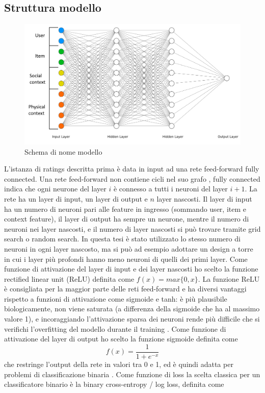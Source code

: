 \documentclass[12pt,italian]{report}
\begin{document}
\subsection{Struttura modello}

\begin{figure}
  \includegraphics[width=\linewidth]{immagini/ffnet_schema.png}
  \caption{Schema di nome modello}
  \label{fig:curse-dim}
\end{figure}

L'istanza di ratings descritta prima è data in input ad una rete feed-forward fully connected. Una rete feed-forward non contiene cicli nel suo grafo \cite{Goodfellow-et-al-2016}, fully connected indica che ogni neurone del layer $i$ è connesso a tutti i neuroni del layer $i+1$. La rete ha un layer di input, un layer di output e $n$ layer nascosti. Il layer di input ha un numero di neuroni pari alle feature in ingresso (sommando user, item e context feature), il layer di output ha sempre un neurone, mentre il numero di neuroni nei layer nascosti, e il numero di layer nascosti si può trovare tramite grid search o random search. In questa tesi è stato utilizzato lo stesso numero di neuroni in ogni layer nascosto, ma si può ad esempio adottare un design a torre in cui i layer più profondi hanno meno neuroni di quelli dei primi layer. Come funzione di attivazione del layer di input e dei layer nascosti ho scelto la funzione rectified linear unit (ReLU) definita come $f(x) = max\{0, x\}$. La funzione ReLU è consigliata per la maggior parte delle reti feed-forward \cite{Goodfellow-et-al-2016} e ha diversi vantaggi rispetto a funzioni di attivazione come sigmoide e tanh: è più plausibile biologicamente, non viene saturata (a differenza della sigmoide che ha al massimo valore 1), e incoraggiando l'attivazione sparsa dei neuroni rende più difficile che si verifichi l'overfitting del modello durante il training \cite{relu}. Come funzione di attivazione del layer di output ho scelto la funzione sigmoide definita come 
$$f
(x) = \frac{1}{1+e^{-x}}
$$
che restringe l'output della rete in valori tra 0 e 1, ed è quindi adatta per problemi di classificazione binaria \cite{choose-act-func}. Come funzione di loss la scelta classica per un classificatore binario è la binary cross-entropy / log loss, definita come
\end{document}
